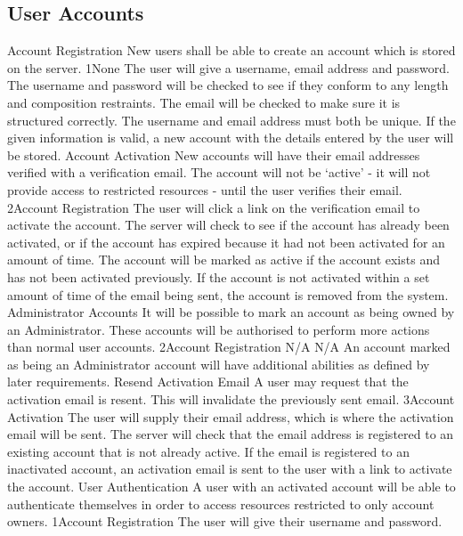 	\subsection{User Accounts}
		\funcreq
			{Account Registration}
			{New users shall be able to create an account which is stored on the server.}
			{1}{None}
			{The user will give a username, email address and password.}
			{The username and password will be checked to see if they conform to any length and composition restraints. The email will be checked to make sure it is structured correctly. The username and email address must both be unique.}
			{If the given information is valid, a new account with the details entered by the user will be stored.}
		\funcreq
			{Account Activation}
			{New accounts will have their email addresses verified with a verification email. The account will not be `active' - it will not provide access to restricted resources - until the user verifies their email.}
			{2}{Account Registration}
			{The user will click a link on the verification email to activate the account.}
			{The server will check to see if the account has already been activated, or if the account has expired because it had not been activated for an amount of time.}
			{The account will be marked as active if the account exists and has not been activated previously. If the account is not activated within a set amount of time of the email being sent, the account is removed from the system.}
		\funcreq
			{Administrator Accounts}
			{It will be possible to mark an account as being owned by an Administrator. These accounts will be authorised to perform more actions than normal user accounts.}
			{2}{Account Registration}
			{N/A}
			{N/A}
			{An account marked as being an Administrator account will have additional abilities as defined by later requirements.}
		\funcreq
			{Resend Activation Email}
			{A user may request that the activation email is resent. This will invalidate the previously sent email.}
			{3}{Account Activation}
			{The user will supply their email address, which is where the activation email will be sent.}
			{The server will check that the email address is registered to an existing account that is not already active.}
			{If the email is registered to an inactivated account, an activation email is sent to the user with a link to activate the account.}
		\funcreq
			{User Authentication}
			{A user with an activated account will be able to authenticate themselves in order to access resources restricted to only account owners.}
			{1}{Account Registration}
			{The user will give their username and password.}
